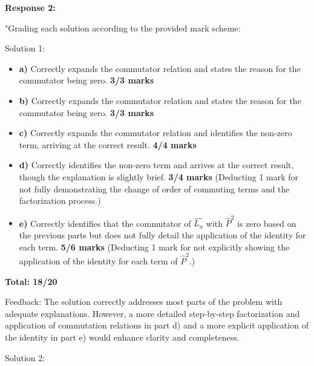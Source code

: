 \documentclass[a4paper,11pt]{article}
\begin{document}
\textbf{Response 2:}

"Grading each solution according to the provided mark scheme:

Solution 1:

\begin{itemize}
    \item \textbf{a)} Correctly expands the commutator relation and states the reason for the commutator being zero. \textbf{3/3 marks}
    \item \textbf{b)} Correctly expands the commutator relation and states the reason for the commutator being zero. \textbf{3/3 marks}
    \item \textbf{c)} Correctly expands the commutator relation and identifies the non-zero term, arriving at the correct result. \textbf{4/4 marks}
    \item \textbf{d)} Correctly identifies the non-zero term and arrives at the correct result, though the explanation is slightly brief. \textbf{3/4 marks} (Deducting 1 mark for not fully demonstrating the change of order of commuting terms and the factorization process.)
    \item \textbf{e)} Correctly identifies that the commutator of \( \hat{L_{x}} \) with \( \hat{P}^{2} \) is zero based on the previous parts but does not fully detail the application of the identity for each term. \textbf{5/6 marks} (Deducting 1 mark for not explicitly showing the application of the identity for each term of \( \hat{P}^{2} \).)
\end{itemize}

\textbf{Total: 18/20}

Feedback: The solution correctly addresses most parts of the problem with adequate explanations. However, a more detailed step-by-step factorization and application of commutation relations in part d) and a more explicit application of the identity in part e) would enhance clarity and completeness.

Solution 2:
\end{document}
